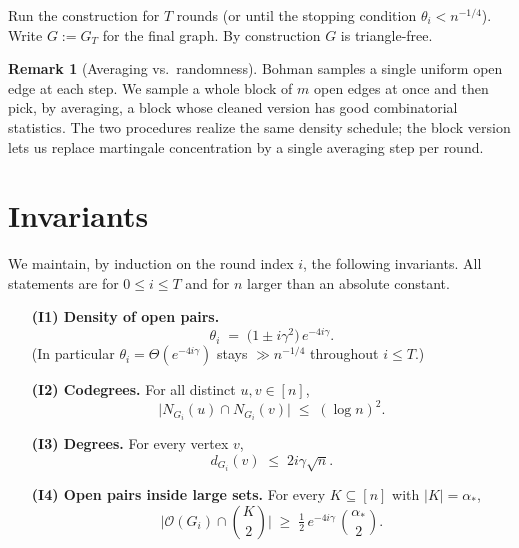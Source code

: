 \documentclass[11pt]{article}
\theoremstyle{definition}
\newtheorem{remark}[theorem]{Remark}
\newcommand{\cO}{\mathcal{O}}
\newcommand{\bin}[2]{\binom{#1}{#2}}
\begin{document}
Run the construction for $T$ rounds (or until the stopping condition $\theta_i<n^{-1/4}$).
Write $G:=G_T$ for the final graph.
By construction $G$ is triangle-free.

\begin{remark}[Averaging vs.\ randomness]
Bohman samples a single uniform open edge at each step.
We sample a whole block of $m$ open edges at once and then pick, by averaging, a block whose cleaned version has good combinatorial statistics.
The two procedures realize the same density schedule; the block version lets us replace martingale concentration by a single averaging step per round.
\end{remark}

\section{Invariants}\label{sec:potential}

We maintain, by induction on the round index $i$, the following invariants.
All statements are for $0\le i\le T$ and for $n$ larger than an absolute constant.

\begin{enumerate}
  \item[\textbf{(I1) Density of open pairs.}]
    \[
      \theta_i \;=\; \bigl(1\pm i\gamma^{2}\bigr)\,e^{-4i\gamma}.
    \]
    (In particular $\theta_i = \Theta(e^{-4i\gamma})$ stays $\gg n^{-1/4}$ throughout $i\le T$.)

  \item[\textbf{(I2) Codegrees.}]
    For all distinct $u,v\in[n]$,
    \[
      \bigl|N_{G_i}(u)\cap N_{G_i}(v)\bigr| \;\le\; (\log n)^{2}.
    \]

  \item[\textbf{(I3) Degrees.}]
    For every vertex $v$,
    \[
      d_{G_i}(v) \;\le\; 2i\gamma\sqrt{n}.
    \]

  \item[\textbf{(I4) Open pairs inside large sets.}]
    For every $K\subseteq[n]$ with $|K|=\alpha_{*}$,
    \[
      \bigl|\cO(G_i)\cap\bin{K}{2}\bigr|
      \;\ge\;
      \tfrac12\,e^{-4i\gamma}\,\bin{\alpha_{*}}{2}.
    \]
\end{enumerate}
\end{document}
